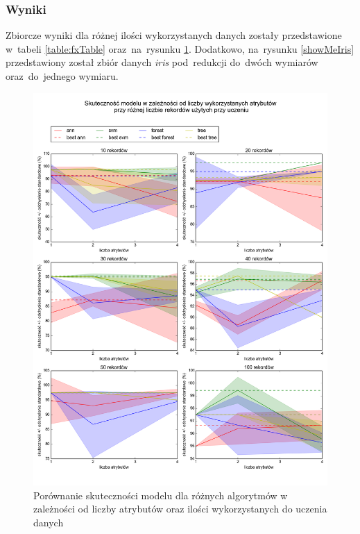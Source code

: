 \subsubsection{Wyniki}
Zbiorcze wyniki dla różnej ilości wykorzystanych danych zostały przedstawione w~tabeli \ref{table:fxTable} oraz~na~rysunku \ref{extractionSummary}. Dodatkowo, na~rysunku \ref{showMeIris} przedstawiony został zbiór danych \textit{iris} pod~redukcji do~dwóch wymiarów oraz~do~jednego wymiaru.


\begin{figure}[ht!]
\centering
\includegraphics[scale=0.45]{res/extractionSummary.png}
\caption[Caption for LOF]{Porównanie skuteczności modelu dla różnych algorytmów w zależności od liczby atrybutów oraz ilości wykorzystanych do uczenia danych\label{extractionSummary}}
\end{figure} 

